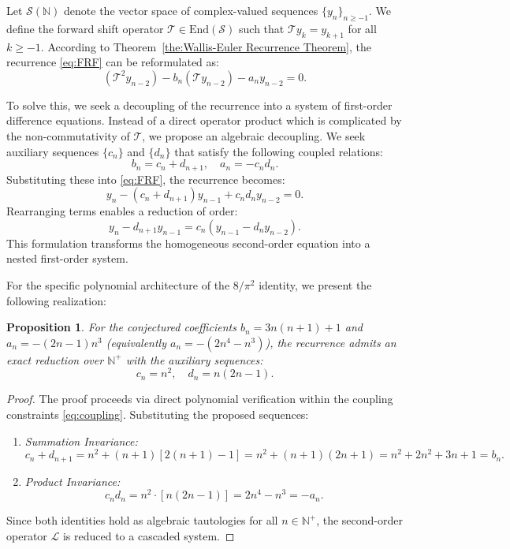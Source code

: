 \documentclass[pdflatex,sn-mathphys-num]{sn-jnl}
\theoremstyle{thmstyleone}
\newtheorem{proposition}[theorem]{Proposition}
\theoremstyle{thmstyletwo}
\theoremstyle{thmstylethree}
\begin{document}
	Let $\mathcal{S}(\mathbb{N})$ denote the vector space of complex-valued sequences $\{y_n\}_{n \ge -1}$. We define the forward shift operator $\mathcal{T} \in \text{End}(\mathcal{S})$ such that $\mathcal{T}y_k = y_{k+1}$ for all $k \ge -1$.
	According to Theorem~\ref{the:Wallis-Euler Recurrence Theorem}, the recurrence \eqref{eq:FRF} can be reformulated as:
	\begin{equation}
		(\mathcal{T}^2 y_{n-2}) - b_n (\mathcal{T}y_{n-2}) - a_n y_{n-2} = 0.
	\end{equation}
	
	To solve this, we seek a decoupling of the recurrence into a system of first-order difference equations. Instead of a direct operator product which is complicated by the non-commutativity of $\mathcal{T}$, we propose an algebraic decoupling. We seek auxiliary sequences $\{c_n\}$ and $\{d_n\}$ that satisfy the following coupled relations:
	\begin{equation}\label{eq:coupling}
		b_n = c_n + d_{n+1}, \quad a_n = -c_n d_n.
	\end{equation}
	Substituting these into \eqref{eq:FRF}, the recurrence becomes:
	\begin{equation}
		y_n - (c_n + d_{n+1}) y_{n-1} + c_n d_n y_{n-2} = 0.
	\end{equation}
	Rearranging terms enables a reduction of order:
	\begin{equation}\label{eq:rearranged_rec}
		y_n - d_{n+1} y_{n-1} = c_n (y_{n-1} - d_n y_{n-2}).
	\end{equation}
	This formulation transforms the homogeneous second-order equation into a nested first-order system.
	
	For the specific polynomial architecture of the $8/\pi^2$ identity, we present the following realization:
	
	\begin{proposition}\label{prop:factor}
		For the conjectured coefficients $b_n = 3n(n+1)+1$ and $a_n = -(2n-1)n^3$ (equivalently $a_n = -(2n^4 - n^3)$), the recurrence admits an exact reduction over $\mathbb{N}^{+}$ with the auxiliary sequences:
		\begin{equation}
			c_n = n^2, \quad d_n = n(2n-1).
		\end{equation}
	\end{proposition}
	
	\begin{proof}
		The proof proceeds via direct polynomial verification within the coupling constraints \eqref{eq:coupling}. Substituting the proposed sequences:
		\begin{enumerate}
			\item \textit{Summation Invariance:}
			\[ c_n + d_{n+1} = n^2 + (n+1)[2(n+1)-1] = n^2 + (n+1)(2n+1) = n^2 + 2n^2 + 3n + 1 = b_n. \]
			\item \textit{Product Invariance:}
			\[ c_n d_n = n^2 \cdot [n(2n-1)] = 2n^4 - n^3 = -a_n. \]
		\end{enumerate}
		Since both identities hold as algebraic tautologies for all $n \in \mathbb{N}^{+}$, the second-order operator $\mathcal{L}$ is reduced to a cascaded system.
	\end{proof}
	
\end{document}
